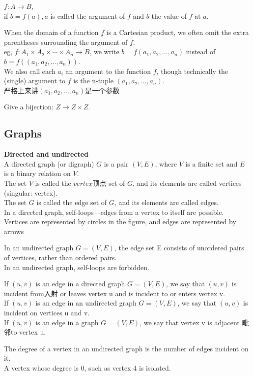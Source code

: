 \documentclass{article}
\begin{document}
$f : A \rightarrow B$, \\
if $b = f(a), a$ is called the argument of $f$ and $b$ the value of $f$ at $a$.

When the domain of a function $f$ is a Cartesian product, we often omit the extra parentheses surrounding the argument of $f$.\\
eg, $f : A_1 \times A_2 \times \cdots \times A_n \rightarrow B$, we write $b = f(a_1,a_2,\ldots,a_n)$ instead of $b = f((a_1,a_2,\ldots,a_n))$. \\
We also call each $a_i$ an argument to the function $f$, though technically the (single) argument to $f$ is the n-tuple $(a_1,a_2,\ldots,a_n)$.\\
严格上来讲$(a_1,a_2,\ldots,a_n)$是一个参数

Give a bijection: $Z \rightarrow Z \times Z$.

\subsection{Graphs}
\textbf{Directed and undirected}\\
A directed graph (or digraph) $G$ is a pair $(V, E)$, where $V$ is a finite set and $E$ is a binary relation on $V$. \\
The set $V$ is called the $vertex顶点$ set of $G$, and its elements are called vertices (singular: vertex).\\
The set $G$ is called the edge set of $G$, and its elements are called edges.\\
In a directed graph, self-loops---edges from a vertex to itself are possible.\\
Vertices are represented by circles in the figure, and edges are represented by arrows

In an undirected graph $G = (V, E)$, the edge set E consists of unordered pairs of vertices, rather than ordered pairs.\\
In an undirected graph, self-loops are forbidden.

\bigskip
If $(u, v)$ is an edge in a directed graph $G = (V, E)$, we say that $(u, v)$ is incident from入射 or leaves vertex u and is incident to or enters vertex v.\\
If $(u, v)$ is an edge in an undirected graph $G = (V, E)$, we say that $(u, v)$ is incident on vertices u and v.\\
If $(u, v)$ is an edge in a graph $G = (V, E)$, we say that vertex v is adjacent 毗邻to vertex u.

The degree of a vertex in an undirected graph is the number of edges incident on it.\\
A vertex whose degree is $0$, such as vertex $4$ is isolated.
\end{document}
